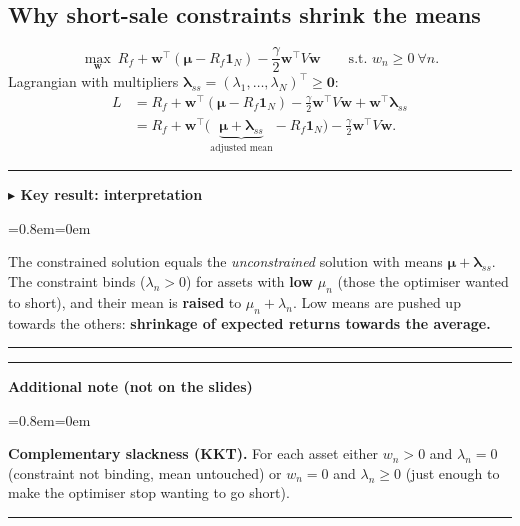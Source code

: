 \documentclass[11pt,a4paper]{report}
\newenvironment{notebox}[1]
  {\par\medskip\Needspace{6\baselineskip}\noindent\rule{\linewidth}{0.4pt}\par\nopagebreak
   \noindent\textbf{#1}\par\nopagebreak
   \begin{list}{}{\leftmargin=0.8em\rightmargin=0em\topsep=2pt}\item[]}
  {\end{list}\nopagebreak\noindent\rule{\linewidth}{0.4pt}\par\medskip}
\newenvironment{keybox}[1][]{\begin{notebox}{$\blacktriangleright$ Key result#1}}{\end{notebox}}
\newenvironment{addnote}{\begin{notebox}{Additional note (not on the slides)}}{\end{notebox}}
\newcommand{\one}{\mathbf{1}_N}
\newcommand{\w}{\bm{w}}
\newcommand{\T}{^{\top}}
\newcommand{\mub}{\bm{\mu}}
\begin{document}
\subsection{Why short-sale constraints shrink the means}
\[
\max_{\w}\ R_f+\w\T(\mub-R_f\one)-\frac\gamma2\w\T V\w\qquad\text{s.t. } w_n\ge0\ \forall n.
\]
Lagrangian with multipliers $\bm\lambda_{ss}=(\lambda_1,\dots,\lambda_N)\T\ge\bm0$:
\begin{align*}
L&=R_f+\w\T(\mub-R_f\one)-\frac\gamma2\w\T V\w+\w\T\bm\lambda_{ss}\\
&=R_f+\w\T\big(\underbrace{\mub+\bm\lambda_{ss}}_{\text{adjusted mean}}-R_f\one\big)-\frac\gamma2\w\T V\w .
\end{align*}
\begin{keybox}[: interpretation]
The constrained solution equals the \emph{unconstrained} solution with means
$\mub+\bm\lambda_{ss}$. The constraint binds ($\lambda_n>0$) for assets with
\textbf{low} $\mu_n$ (those the optimiser wanted to short), and their mean is
\textbf{raised} to $\mu_n+\lambda_n$. Low means are pushed up towards the others:
\textbf{shrinkage of expected returns towards the average.}
\end{keybox}
\begin{addnote}
\textbf{Complementary slackness (KKT).} For each asset either $w_n>0$ and
$\lambda_n=0$ (constraint not binding, mean untouched) or $w_n=0$ and
$\lambda_n\ge0$ (just enough to make the optimiser stop wanting to go short).
\end{addnote}
\end{document}
